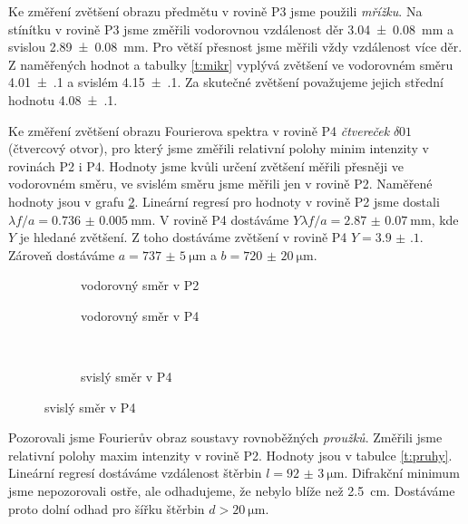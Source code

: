 Ke změření zvětšení obrazu předmětu v rovině P3 jsme použili \emph{mřížku}. Na stínítku v rovině P3 jsme změřili vodorovnou vzdálenost děr \SI{3.04(8)}{\mm} a svislou \SI{2.89(8)}{\mm}. Pro větší přesnost jsme měřili vždy vzdálenost více děr. Z naměřených hodnot a tabulky \ref{t:mikr} vyplývá zvětšení ve vodorovném směru \num{4.01(10)} a svislém \num{4.15(10)}. Za skutečné zvětšení považujeme jejich střední hodnotu \num{4.08(10)}.






Ke změření zvětšení obrazu Fourierova spektra v rovině P4 \emph{čtvereček} $\delta01$ (čtvercový otvor), pro který jsme změřili relativní polohy minim intenzity v rovinách P2 i P4. Hodnoty jsme kvůli určení zvětšení měřili přesněji ve vodorovném směru, ve svislém směru jsme měřili jen v rovině P2. Naměřené hodnoty jsou v grafu \ref{g:ctv}. Lineární regresí pro hodnoty v rovině P2 jsme dostali $\lambda f/a=\SI{0.736(5)}{\mm}$. V rovině P4 dostáváme $Y\lambda f/a=\SI{2.87(7)}{\mm}$, kde $Y$ je hledané zvětšení. Z toho dostáváme zvětšení v rovině P4 $Y=\num{3.9(1)}$. Zároveň dostáváme $a=\SI{737(5)}{\micro\meter}$ a $b=\SI{720(20)}{\micro\metre}$. 

\begin{figure}[htbp]
\centering
\begin{subfigure}{.5\textwidth}
  \centering
  
  \caption{vodorovný směr v P2}
\end{subfigure}%
\begin{subfigure}{.5\textwidth}
  \centering
  
  \caption{vodorovný směr v P4}
\end{subfigure}
\\
\begin{subfigure}{.5\textwidth}
  \centering
  
  \label{g:svislectv}
  \caption{svislý směr v P4}
\end{subfigure}
\label{g:ctv}
\end{figure}


Pozorovali jsme Fourierův obraz soustavy rovnoběžných \emph{proužků}. Změřili jsme relativní polohy maxim intenzity v rovině P2. Hodnoty jsou v tabulce \ref{t:pruhy}. Lineární regresí dostáváme vzdálenost štěrbin $l=\SI{92(3)}{\micro\metre}$. Difrakční minimum jsme nepozorovali ostře, ale odhadujeme, že nebylo blíže než \SI{2.5}{\cm}. Dostáváme proto dolní odhad pro šířku štěrbin $d>\SI{20}{\micro\metre}$.

